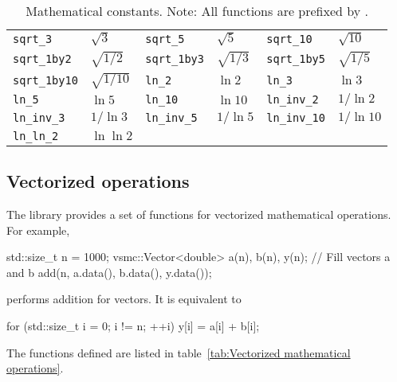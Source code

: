 \begin{table}[ht]
\begin{tabu}{X[2l]X[l]X[2l]X[l]X[2l]X[l]}
    \texttt{sqrt\_3}        & $\sqrt{3}$         &
    \texttt{sqrt\_5}        & $\sqrt{5}$         &
    \texttt{sqrt\_10}       & $\sqrt{10}$        \\
    \texttt{sqrt\_1by2}     & $\sqrt{1/2}$       &
    \texttt{sqrt\_1by3}     & $\sqrt{1/3}$       &
    \texttt{sqrt\_1by5}     & $\sqrt{1/5}$       \\
    \texttt{sqrt\_1by10}    & $\sqrt{1/10}$      &
    \texttt{ln\_2}          & $\ln{2}$           &
    \texttt{ln\_3}          & $\ln{3}$           \\
    \texttt{ln\_5}          & $\ln{5}$           &
    \texttt{ln\_10}         & $\ln{10}$          &
    \texttt{ln\_inv\_2}     & $1/\ln{2}$         \\
    \texttt{ln\_inv\_3}     & $1/\ln{3}$         &
    \texttt{ln\_inv\_5}     & $1/\ln{5}$         &
    \texttt{ln\_inv\_10}    & $1/\ln{10}$        \\
    \texttt{ln\_ln\_2}      & $\ln\ln{2}$        &
    &                    &
    &                    \\
    \bottomrule
  \end{tabu}
  \caption{Mathematical constants. Note: All functions are prefixed by
    .}
  \label{tab:Mathematical constants}
\end{table}

\subsection{Vectorized operations}
\label{sub:Vectorized operations}

The library provides a set of functions for vectorized mathematical operations.
For example,
\begin{cppcode}
  std::size_t n = 1000;
  vsmc::Vector<double> a(n), b(n), y(n);
  // Fill vectors a and b
  add(n, a.data(), b.data(), y.data());
\end{cppcode}
performs addition for vectors. It is equivalent to
\begin{cppcode}
  for (std::size_t i = 0; i != n; ++i)
      y[i] = a[i] + b[i];
\end{cppcode}
The functions defined are listed in table~\ref{tab:Vectorized mathematical
  operations}.

